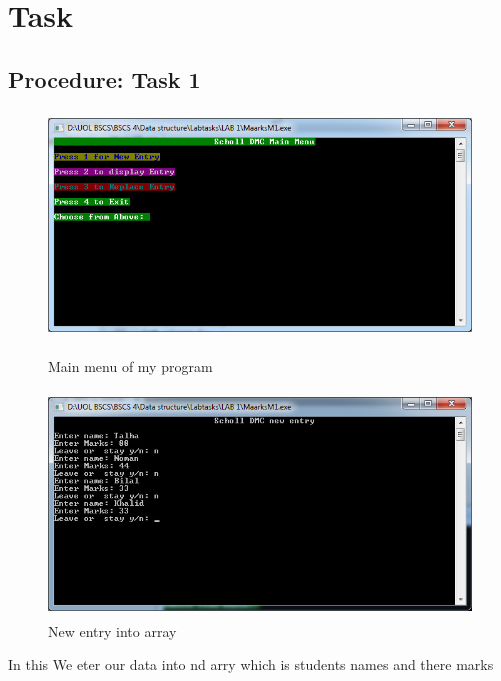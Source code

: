\documentclass[11pt]{article}            %
\begin{document}
\section{Task}  
\subsection{Procedure: Task 1 }     

\begin{figure}
\centering
  \includegraphics[width=12cm,height=6cm,keepaspectratio]{1.jpg}
\caption{Main menu of my program}
\label{Figure:1}    
  \includegraphics[width=12cm,height=6cm,keepaspectratio]{2.jpg}
\caption{New entry into array}
\label{Figure:2}   
\end{figure}
In this We eter our data into nd  arry which is students names and there marks
\end{document}
